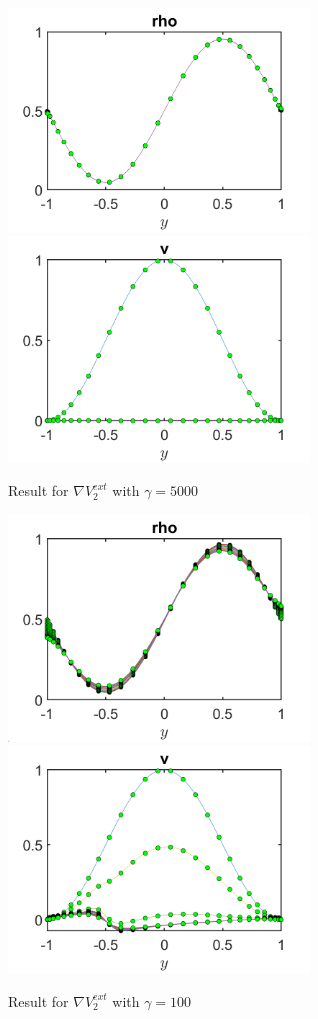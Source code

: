 \documentclass[11pt, a4paper]{article}
\theoremstyle{definition}
\begin{document}
\begin{figure}
	\includegraphics[width=8cm]{rho4.png}
	\includegraphics[width=8cm]{v4.png}
	\caption{Result for $\nabla V^{ext}_2 $ with $\gamma =5000$}
	\label{Figure4}
\end{figure}
\begin{figure}
	\includegraphics[width=8cm]{rho5.png}
	\includegraphics[width=8cm]{v5.png}
	\caption{Result for $\nabla V^{ext}_2 $ with $\gamma =100$}
	\label{Figure5}
\end{figure}
\end{document}
